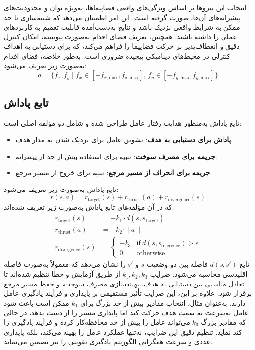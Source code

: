 	انتخاب این نیروها بر اساس ویژگی‌های واقعی فضاپیماها، به‌ویژه توان و محدودیت‌های پیشرانه‌های آن‌ها، صورت گرفته است. این امر اطمینان می‌دهد که شبیه‌سازی تا حد ممکن به شرایط واقعی نزدیک باشد و نتایج به‌دست‌آمده قابلیت تعمیم به کاربردهای عملی را داشته باشند. همچنین، تعریف فضای اقدام به‌صورت پیوسته، امکان کنترل دقیق و انعطاف‌پذیر بر حرکت فضاپیما را فراهم می‌کند، که برای دستیابی به اهداف کنترلی در محیط‌های دینامیکی پیچیده ضروری است.
	به‌طور خلاصه، فضای اقدام به‌صورت زیر تعریف می‌شود:
	\[
	a = \{ f_x, f_y \mid f_x \in [-f_{x,\text{max}}, f_{x,\text{max}}], \, f_y \in [-f_{y,\text{max}}, f_{y,\text{max}}] \}
	\]
	
	
	
	
	
	
	
	
	
	
	
	
	
	
	
	\subsection{تابع پاداش }
	تابع پاداش
 به‌منظور هدایت رفتار عامل طراحی شده و شامل دو مؤلفه اصلی است:
	\begin{itemize}
		\item \textbf{پاداش برای دستیابی به هدف}: تشویق عامل برای نزدیک شدن به مدار هدف.
		\item \textbf{جریمه برای مصرف سوخت}: تنبیه برای استفاده بیش از حد از پیشرانه.
		\item \textbf{جریمه برای انحراف از مسیر مرجع}: تنبیه برای خروج از مسیر مرجع.
	\end{itemize}
	تابع پاداش به‌صورت زیر تعریف می‌شود:
	\[
	r(s, a) = r_{\text{target}}(s) + r_{\text{thrust}}(a)  + r_{\text{divergence}}(s)
	\]
	که در آن مؤلفه‌های تابع پاداش به‌صورت زیر تعریف شده‌اند:
	\begin{align}
	r_{\text{target}}(s) &= -k_1 \cdot d(s, s_{\text{target}}) \\
	r_{\text{thrust}}(a) &= -k_2 \cdot \|a\| \\	
	r_{\text{divergence}}(s) &= \begin{cases}
	-k_3 & \text{if} ~ d(s, s_{\text{reference}}) > \epsilon \\
	0 & \text{otherwise}
	\end{cases}
	\end{align}
تابع \( d(s, s') \) فاصله بین دو وضعیت \( s \) و \( s' \) را نشان می‌دهد که معمولاً به‌صورت فاصله اقلیدسی محاسبه می‌شود.
ضرایب \( k_1, k_2, k_3 \) از طریق آزمایش و خطا تنظیم شده‌اند تا تعادل مناسبی بین دستیابی به هدف، بهینه‌سازی مصرف سوخت، و حفظ مسیر مرجع برقرار شود. علاوه بر این، این ضرایب تأثیر مستقیمی بر پایداری و فرآیند یادگیری عامل دارند. به‌عنوان مثال، انتخاب مقادیر بیش از حد بزرگ برای \( k_1 \) ممکن است باعث شود عامل به‌سرعت به سمت هدف حرکت کند اما پایداری مسیر را از دست بدهد، در حالی که مقادیر بزرگ \( k_3 \) می‌تواند عامل را بیش از حد محافظه‌کار کرده و فرآیند یادگیری را کند نماید. تنظیم دقیق این ضرایب، نه‌تنها عملکرد عامل را بهینه می‌کند، بلکه پایداری عددی و سرعت همگرایی الگوریتم یادگیری تقویتی را نیز تضمین می‌نماید.
	
